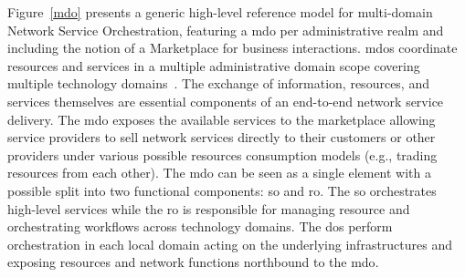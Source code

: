 Figure~\ref{mdo} presents a generic high-level reference model for multi-domain Network Service Orchestration, featuring a \gls{mdo} per administrative realm and including the notion of a Marketplace for business interactions. 
\glspl{mdo} coordinate resources and services in a multiple administrative domain scope covering multiple technology domains~\cite{5GPPPArchitectureWorkingGroup2016ViewArchitecture}. 
The exchange of information, resources, and services themselves are essential components of an end-to-end network service delivery.  The \gls{mdo} exposes the available services to the marketplace allowing service providers to sell network services directly to their customers or other providers under various possible resources consumption models (e.g., trading resources from each other). 
The \gls{mdo} can be seen as a single element with a possible split into two functional components: \gls{so} and \gls{ro}. The \gls{so} orchestrates high-level services while the \gls{ro} is responsible for managing resource and orchestrating workflows across technology domains. 
The \glspl{do} perform orchestration in each local domain acting on the underlying infrastructures and exposing resources and network functions northbound to the \gls{mdo}. 

